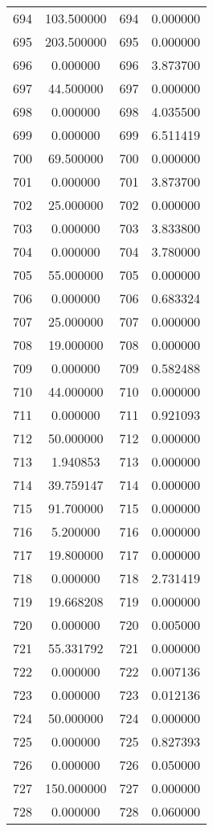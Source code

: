 \documentclass[12pt]{article}
\begin{document}
\begin{longtable}{@{}cccc@{}}
694 & 103.500000 & 694 & 0.000000 \\
695 & 203.500000 & 695 & 0.000000 \\
696 & 0.000000 & 696 & 3.873700 \\
697 & 44.500000 & 697 & 0.000000 \\
698 & 0.000000 & 698 & 4.035500 \\
699 & 0.000000 & 699 & 6.511419 \\
700 & 69.500000 & 700 & 0.000000 \\
701 & 0.000000 & 701 & 3.873700 \\
702 & 25.000000 & 702 & 0.000000 \\
703 & 0.000000 & 703 & 3.833800 \\
704 & 0.000000 & 704 & 3.780000 \\
705 & 55.000000 & 705 & 0.000000 \\
706 & 0.000000 & 706 & 0.683324 \\
707 & 25.000000 & 707 & 0.000000 \\
708 & 19.000000 & 708 & 0.000000 \\
709 & 0.000000 & 709 & 0.582488 \\
710 & 44.000000 & 710 & 0.000000 \\
711 & 0.000000 & 711 & 0.921093 \\
712 & 50.000000 & 712 & 0.000000 \\
713 & 1.940853 & 713 & 0.000000 \\
714 & 39.759147 & 714 & 0.000000 \\
715 & 91.700000 & 715 & 0.000000 \\
716 & 5.200000 & 716 & 0.000000 \\
717 & 19.800000 & 717 & 0.000000 \\
718 & 0.000000 & 718 & 2.731419 \\
719 & 19.668208 & 719 & 0.000000 \\
720 & 0.000000 & 720 & 0.005000 \\
721 & 55.331792 & 721 & 0.000000 \\
722 & 0.000000 & 722 & 0.007136 \\
723 & 0.000000 & 723 & 0.012136 \\
724 & 50.000000 & 724 & 0.000000 \\
725 & 0.000000 & 725 & 0.827393 \\
726 & 0.000000 & 726 & 0.050000 \\
727 & 150.000000 & 727 & 0.000000 \\
728 & 0.000000 & 728 & 0.060000 \\

\end{longtable}
\end{document}
